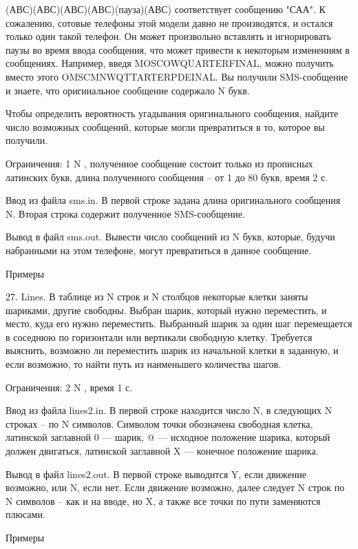 \documentclass[]{article}
\begin{document}
(АВС)(АВС)(АВС)(АВС)(пауза)(АВС)
соответствует сообщению "САА". К сожалению, сотовые телефоны этой модели давно не производятся, и остался только один такой телефон. Он может произвольно вставлять и игнорировать паузы во время ввода сообщения, что может привести к некоторым изменениям в сообщениях. Например, введя MOSCOWQUARTERFINAL, можно получить вместо этого OMSCMNWQTTARTERPDEINAL. Вы получили SMS-сообщение и знаете, что оригинальное сообщение содержало N букв.

Чтобы определить вероятность угадывания оригинального сообщения, найдите число возможных сообщений, которые могли превратиться в то, которое вы получили.



Ограничения: 1 \leq N , полученное сообщение состоит только из прописных латинских букв, длина полученного сообщения – от 1 до 80 букв, время 2 с.

Ввод из файла sms.in. В первой строке задана длина оригинального сообщения N. Вторая строка содержит полученное SMS-сообщение.

Вывод в файл sms.out. Вывести число сообщений из N букв, которые, будучи набранными на этом телефоне, могут превратиться в данное сообщение.

Примеры



27. Lines. В таблице из N строк и N столбцов некоторые клетки заняты шариками, другие свободны. Выбран шарик, который нужно переместить, и место, куда его нужно переместить. Выбранный шарик за один шаг перемещается в соседнюю по горизонтали или вертикали свободную клетку. Требуется выяснить, возможно ли переместить шарик из начальной клетки в заданную, и если возможно, то найти путь из наименьшего количества шагов.

Ограничения: 2 \leq N , время 1 с.

Ввод из файла lines2.in. В первой строке находится число N, в следующих N строках – по N символов. Символом точки обозначена свободная клетка, латинской заглавной 0 — шарик, @ — исходное положение шарика, который должен двигаться, латинской заглавной X — конечное положение шарика.

Вывод в файл lines2.out. В первой строке выводится Y, если движение возможно, или N, если нет. Если движение возможно, далее следует N строк по N символов – как и на вводе, но X, а также все точки по пути заменяются плюсами.

Примеры
\end{document}

